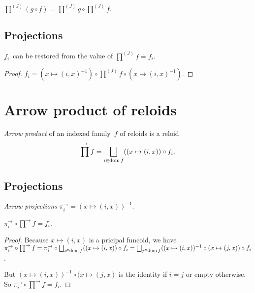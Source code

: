 \begin{conjecture}
$\prod^{(J)}(g\circ f)=\prod^{(J)}g\circ\prod^{(J)}f$.
\end{conjecture}

\subsection{Projections}

\begin{thm}
$f_i$~can be restored from the value of $\prod^{(J)}f=f_i$.
\end{thm}

\begin{proof}
$f_i = (x\mapsto(i,x)^{-1})\circ\prod^{(J)}f\circ(x\mapsto(i,x)^{-1})$.
\end{proof}

\section{Arrow product of reloids}

\begin{defn}
\emph{Arrow product} of an indexed family~$f$ of reloids is
a reloid \[ \prod^{\rightarrow} f=\bigsqcup_{i\in\dom f}((x\mapsto(i,x))\circ f_i. \]
\end{defn}

\subsection{Projections}

\begin{defn}
\emph{Arrow projections}
$\pi^{\rightarrow}_i = (x\mapsto(i,x))^{-1}$.
\end{defn}

\begin{prop}
$\pi^{\rightarrow}_i\circ\prod^{\rightarrow}f=f_i$.
\end{prop}

\begin{proof}
Because $x\mapsto(i,x)$ is a pricipal funcoid, we have
$\pi^{\rightarrow}_i\circ\prod^{\rightarrow}f=
\pi^{\rightarrow}_i\circ\bigsqcup_{i\in\dom f}((x\mapsto(i,x))\circ f_i=
\bigsqcup_{j\in\dom f}((x\mapsto(i,x))^{-1}\circ(x\mapsto(j,x))\circ f_i$.

But $(x\mapsto(i,x))^{-1}\circ(x\mapsto(j,x)$ is the identity if $i=j$ or empty otherwise. So $\pi^{\rightarrow}_i\circ\prod^{\rightarrow}f=f_i$.
\end{proof}